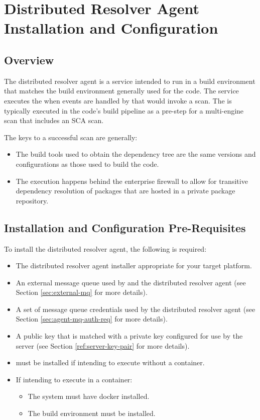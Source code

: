 \section{Distributed Resolver Agent Installation and Configuration}\label{sec:resolver-agent}

\subsection{Overview}

The distributed resolver agent is a service intended to run in a build environment that
matches the build environment generally used for the code.  The service executes
the \scaresolver when events are handled by \cxoneflow that would invoke a scan.
The \scaresolver is typically executed in the code's build pipeline as a pre-step
for a multi-engine \cxone scan that includes an SCA scan.

The keys to a successful \scaresolver scan are generally:

\begin{itemize}
  \item The build tools used to obtain the dependency tree are the same versions and
    configurations as those used to build the code.
  \item The execution happens behind the enterprise firewall to allow for transitive
    dependency resolution of packages that are hosted in a private package repository.
\end{itemize}


\subsection{Installation and Configuration Pre-Requisites}

To install the distributed resolver agent, the following is required:

\begin{itemize}
  \item The distributed resolver agent installer appropriate for your target platform.
  \item An external message queue used by \cxoneflow and the distributed resolver agent (see Section \ref{sec:external-mq} for more details).
  \item A set of message queue credentials used by the distributed resolver agent (see Section \ref{sec:agent-mq-auth-req} for more details).
  \item A public key that is matched with a private key configured for use by the \cxoneflow server (see Section \ref{ref:server-key-pair} for more details).
  \item \scaresolver must be installed if intending to execute \scaresolver without a container.
  \item If intending to execute \scaresolver in a container:
  \begin{itemize}
    \item The system must have docker installed.
    \item The \toolkit build environment must be installed.
  \end{itemize}
\end{itemize}


